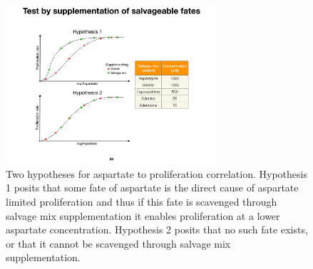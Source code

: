 \begin{figure}
    \centering
    \includegraphics[width=0.70\textwidth]{figures/chap1/asp_fates_suppl_hypo.pdf}
    \caption[Two hypotheses for aspartate to proliferation correlation.]{
    Two hypotheses for aspartate to proliferation correlation.
    Hypothesis 1 posits that some fate of aspartate is the direct cause of aspartate limited proliferation and thus if this fate is scavenged through salvage mix supplementation it enables proliferation at a lower aspartate concentration.
    Hypothesis 2 posits that no such fate exists, or that it cannot be scavenged through salvage mix supplementation.
    }
    \label{fig:ch1:asp_fates_suppl_hypo}
\end{figure}







